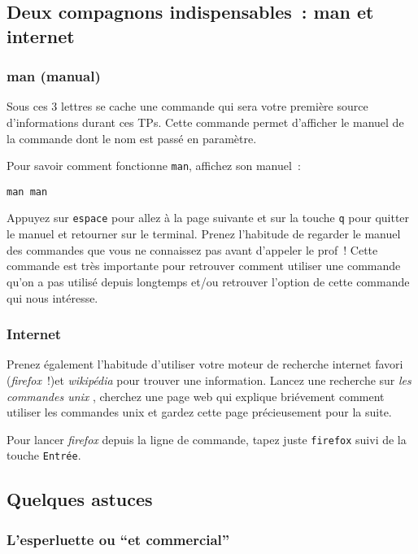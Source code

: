 \documentclass[12pt,a4paper]{article}
\begin{document}
\subsection{Deux compagnons indispensables~: man et internet}

\subsubsection{man (manual)}
Sous ces 3 lettres se cache une commande qui sera votre première source d'informations durant ces TPs. Cette commande permet d'afficher le manuel de la commande dont le nom est passé en paramètre.

Pour savoir comment fonctionne \verb+man+, affichez son manuel~:
\begin{lstlisting}[frame=single]
 	man man
\end{lstlisting}

Appuyez sur \verb+espace+ pour allez à la page suivante et sur la
touche \verb+q+ pour quitter le manuel et retourner sur le
terminal. Prenez l'habitude de regarder le manuel des commandes que
vous ne connaissez pas avant d'appeler le prof~! Cette commande est
très importante pour retrouver comment utiliser une commande qu'on a
pas utilisé depuis longtemps et/ou retrouver l'option de cette
commande qui nous intéresse. 

\subsubsection{Internet}

Prenez également l'habitude d'utiliser votre moteur de recherche
internet favori (\emph{firefox}~!)et \emph{wikipédia} pour trouver une
information. Lancez une recherche sur \og \textit{les commandes unix}
\fg{}, cherchez une page web qui explique briévement comment utiliser
les commandes unix et gardez cette page précieusement pour la suite. 

Pour lancer \emph{firefox} depuis la ligne de commande, tapez juste
{\tt firefox} suivi de la touche {\tt Entrée}.



\subsection{Quelques astuces}

\subsubsection{L'esperluette ou ``et commercial''}
\end{document}
